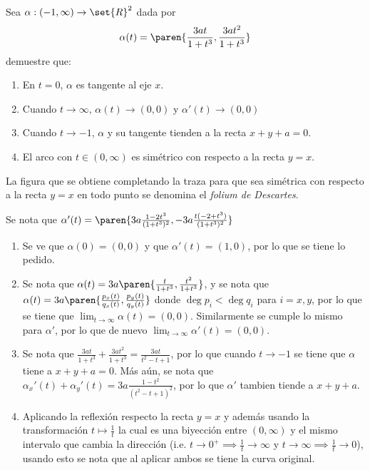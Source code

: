 \documentclass{homework}
\begin{document}
\begin{prob}
    Sea \(\alpha:(-1,\infty)\rightarrow\set{R}^2\) dada por
    \begin{equation*}
        \alpha(t)=\paren{\frac{3at}{1+t^3},\frac{3at^2}{1+t^3}}
    \end{equation*}
    demuestre que:
    \begin{enumerate}
        \item En \(t=0\), \(\alpha\) es tangente al eje \(x\).
        \item Cuando \(t\rightarrow \infty\), \(\alpha(t)\rightarrow(0,0)\) y \(\alpha'(t)\rightarrow(0,0)\)
        \item Cuando \(t\rightarrow-1\), \(\alpha\) y su tangente tienden a la recta \(x+y+a=0\).
        \item El arco con \(t\in(0,\infty)\) es simétrico con respecto a la recta \(y=x\).
    \end{enumerate}
    La figura que se obtiene completando la traza para que sea simétrica con respecto a la recta \(y=x\) en todo punto se denomina el \textit{folium de Descartes}.
\end{prob}

\begin{sol}
    Se nota que \(\alpha'(t)=\paren{3a\frac{1 - 2 t^3}{(1 + t^3)^2},-3a\frac{t (-2 + t^3)}{(1 + t^3)^2}}\)
    \begin{enumerate}
        \item Se ve que \(\alpha(0)=(0,0)\) y que \(\alpha'(t)=(1,0)\), por lo que se tiene lo pedido.
        \item Se nota que \(\alpha(t)=3a\paren{\frac{t}{1+t^3},\frac{t^2}{1+t^3}}\), y se nota que \(\alpha(t)=3a\paren{\frac{p_x(t)}{q_x(t)},\frac{p_y(t)}{q_y(t)}}\) donde \(\deg p_i<\deg q_i\) para \(i=x,y\), por lo que se tiene que \(\lim_{t\rightarrow\infty}\alpha(t)=(0,0)\). Similarmente se cumple lo mismo para \(\alpha'\), por lo que de nuevo \(\lim_{t\rightarrow\infty}\alpha'(t)=(0,0)\).
        \item Se nota que \(\frac{3at}{1+t^3}+\frac{3at^2}{1+t^3}=\frac{3at}{t^2-t+1}\), por lo que cuando \(t\rightarrow-1\) se tiene que \(\alpha\) tiene a \(x+y+a=0\). Más aún, se nota que \(\alpha_x'(t)+\alpha_y'(t)=3a\frac{1-t^2}{(t^2-t+1)^2}\), por lo que \(\alpha'\) tambien tiende a \(x+y+a\).
        \item Aplicando la reflexión respecto la recta \(y=x\) y además usando la transformación \(t\mapsto \frac1t\) la cual es una biyección entre \((0,\infty)\) y el mismo intervalo que cambia la dirección (i.e. \(t\rightarrow0^+\implies\frac1t\rightarrow\infty\) y \(t\rightarrow\infty\implies\frac1t\rightarrow0\)), usando esto se nota que al aplicar ambos se tiene la curva original.
    \end{enumerate}
\end{sol}
\end{document}
